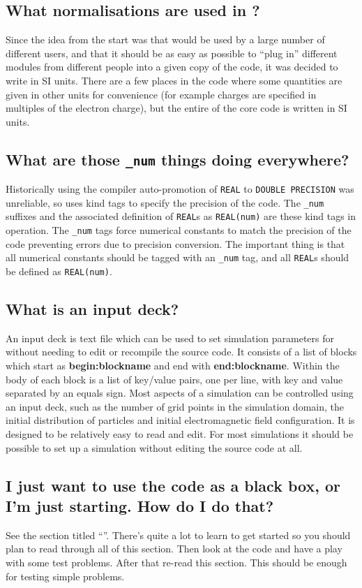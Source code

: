 \documentclass[12pt,a4paper]{article}
\newcommand{\sectit}[1]{See the section titled ``{\bf\titleref{sec:#1}}''.}
\newcommand{\code}[1]{{\texttt{#1}}}
\newcommand{\inlineemph}[1]{{\color{warwicklight} \bf{#1}}}
\newcommand{\EPOCH}{{\color{warwickdark}\fontfamily{phv}\selectfont{EPOCH}}}
\begin{document}
\subsection{What normalisations are used in {\EPOCH}?}
Since the idea from the start was that {\EPOCH} would be used by a large number
of different users, and that it should be as easy as possible to ``plug in''
different modules from different people into a given copy of the code, it was
decided to write {\EPOCH} in SI units. There are a few places in the code where
some quantities are given in other units for convenience (for example charges
are specified in multiples of the electron charge), but the entire of the core
code is written in SI units.

\subsection{What are those \code{\_num} things doing everywhere?}
Historically using the compiler auto-promotion of \code{REAL} to
\code{DOUBLE PRECISION} was unreliable, so {\EPOCH} uses kind tags to specify
the precision of the code. The \code{\_num} suffixes and the associated
definition of \code{REAL}s as \code{REAL(num)} are these kind tags in
operation. The \code{\_num} tags force numerical constants to match the
precision of the code preventing errors due to precision conversion. The
important thing is that all numerical constants should be tagged with an
\code{\_num} tag, and all \code{REAL}s should be defined as \code{REAL(num)}.

\subsection{What is an input deck?}
An input deck is text file which can be used to set simulation parameters
for {\EPOCH} without needing to edit or recompile the source code.
It consists of a list of blocks which start as \inlineemph{begin:blockname}
and end with \inlineemph{end:blockname}. Within the body of each block is
a list of key/value pairs, one per line, with key and value separated by
an equals sign. Most aspects of a simulation can be controlled using an
input deck, such as the number of grid points in the simulation domain,
the initial distribution of particles and initial electromagnetic field
configuration. It is designed to be relatively easy to read and edit. For
most simulations it should be possible to set up a simulation without
editing the source code at all.

\subsection{I just want to use the code as a black box, or I'm just
  starting. How do I do that?}
\sectit{gettingstarted} There's quite a lot to learn to get started so you
should plan to read through all of this section. Then look at the code and have
a play with some test problems. After that re-read this section. This should be
enough for testing simple problems.
\end{document}

